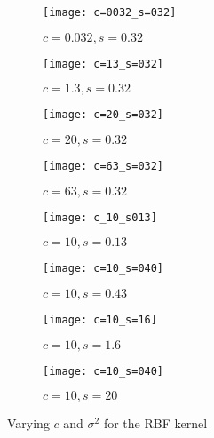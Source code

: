 \documentclass[conference,compsoc]{IEEEtran}
\begin{document}
\begin{figure*}
\begin{subfigure}{0.3\textwidth}
   \texttt{[image: c=0032\_s=032]}
   \caption{$c=0.032, s=0.32$} \label{fig:x_a}
\end{subfigure}
\hspace*{\fill}
\begin{subfigure}{0.3\textwidth}
   \texttt{[image: c=13\_s=032]}
   \caption{$c=1.3, s=0.32$} \label{fig:x_b}
\end{subfigure}
\hspace*{\fill}
\begin{subfigure}{0.3\textwidth}
   \texttt{[image: c=20\_s=032]}
   \caption{$c=20, s=0.32$} \label{fig:x_c}
\end{subfigure}

\bigskip
\begin{subfigure}{0.3\textwidth}
   \texttt{[image: c=63\_s=032]}
   \caption{$c=63, s=0.32$} \label{fig:x_d}
\end{subfigure}
\hspace*{\fill}
\begin{subfigure}{0.3\textwidth}
   \texttt{[image: c\_10\_s013]}
   \caption{$c=10, s=0.13$} \label{fig:x_e}
\end{subfigure}
\hspace*{\fill}
\begin{subfigure}{0.3\textwidth}
   \texttt{[image: c=10\_s=040]}
   \caption{$c=10, s=0.43$} \label{fig:x_f}
\end{subfigure}

\bigskip
\hspace*{\fill}
\begin{subfigure}{0.3\textwidth}
   \texttt{[image: c=10\_s=16]}
   \caption{$c=10, s=1.6$} \label{fig:x_g}
\end{subfigure}%
\hspace*{0.05\textwidth}%
\begin{subfigure}{0.3\textwidth}
   \texttt{[image: c=10\_s=040]}
   \caption{$c=10, s=20$} \label{fig:x_h}
\end{subfigure}
\hspace*{\fill}

\caption{Varying $c$ and $\sigma^2$ for the RBF kernel}
    \label{fig:rbf}
\end{figure*}
\end{document}
